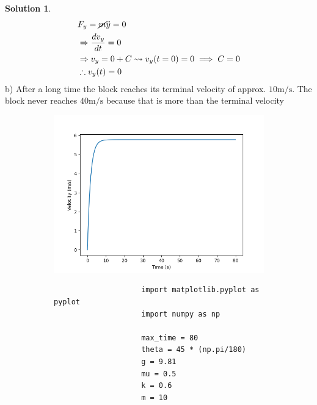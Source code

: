 \documentclass[10pt]{article}
\theoremstyle{definition}
\newtheorem{soln}{Solution}
\begin{document}
\begin{soln}
     \begin{align*}
           & F_y=\cancel{m}\ddot{y}=0                                     \\
           & \Rightarrow\frac{dv_y}{dt}=0                                 \\
           & \Rightarrow v_y=0+C \rightsquigarrow v_y(t=0)=0 \implies C=0 \\
           & \therefore v_y(t)=0                                          \\
     \end{align*}
     b) After a long time the block reaches its terminal velocity of approx. $10\unit{\meter\per\second}$. The block never reaches $40\unit{\meter\per\second}$ because that is more than the terminal velocity
     ~\\\begin{figure}[h]
          \begin{subfigure}[t]{0.49\textwidth}
               \vspace{-27pt}
               \includegraphics[width=\textwidth]{Figure_3.png}
          \end{subfigure}\hfill
          \begin{subfigure}[t]{0.49\textwidth}
               \begin{verbatim}
                    import matplotlib.pyplot as pyplot
                    import numpy as np

                    max_time = 80
                    theta = 45 * (np.pi/180)
                    g = 9.81
                    mu = 0.5
                    k = 0.6
                    m = 10


\end{verbatim}
\end{subfigure}
\end{figure}
\end{soln}
\end{document}

